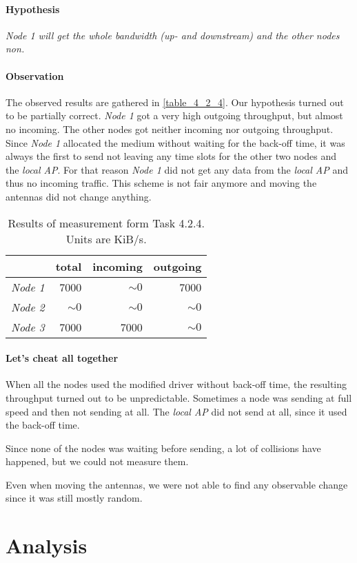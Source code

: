 \documentclass[12pt,a4paper]{article}
\begin{document}
\paragraph{Hypothesis}
\emph{Node 1 will get the whole bandwidth (up- and downstream) and the other nodes non.}

\paragraph{Observation}
The observed results are gathered in \autoref{table_4_2_4}.
Our hypothesis turned out to be partially correct.
\emph{Node 1} got a very high outgoing throughput, but almost no incoming.
The other nodes got neither incoming nor outgoing throughput.
Since \emph{Node 1} allocated the medium without waiting for the back-off time, it was always the first to send not leaving any time slots for the other two nodes and the \emph{local AP}. For that reason \emph{Node 1} did not get any data from the \emph{local AP} and thus no incoming traffic.
This scheme is not fair anymore and moving the antennas did not change anything.

\begin{table}
	\begin{center}
		\begin{tabular}{r|r|r|r}\
		 & total & incoming & outgoing \\
		 \hline 
		 \emph{Node 1} & 7000 & $\sim0$ & 7000 \\
		 \emph{Node 2} & $\sim0$ & $\sim0$ & $\sim0$ \\
		 \emph{Node 3} & 7000 & 7000 & $\sim0$ \\
		\end{tabular}
		
		\caption{Results of measurement form Task 4.2.4. Units are KiB/s.}
		\label{table_4_2_4}
	\end{center}
	\end{table}

\paragraph{Let's cheat all together}
When all the nodes used the modified driver without back-off time, the resulting throughput turned out to be unpredictable. Sometimes a node was sending at full speed and then not sending at all. The \emph{local AP} did not send at all, since it used the back-off time.

Since none of the nodes was waiting before sending, a lot of collisions have happened, but we could not measure them.

Even when moving the antennas, we were not able to find any observable change since it was still mostly random.
\section{Analysis}


\end{document}

